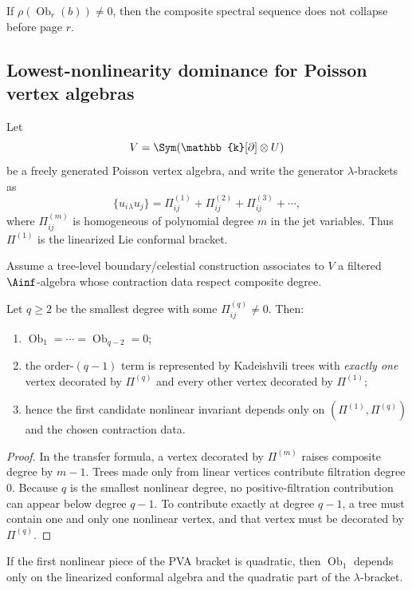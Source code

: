 \begin{corollary}
If $\rho(\operatorname{Ob}_r(b))\neq0$, then the composite spectral sequence does not collapse before page $r$.
\end{corollary}

\subsection{Lowest-nonlinearity dominance for Poisson vertex algebras}

Let
\[
V=\Sym(\mathbb{k}[\partial]\otimes U)
\]
be a freely generated Poisson vertex algebra, and write the generator $\lambda$-brackets as
\[
\{u_i{}_\lambda u_j\}
=
\Pi^{(1)}_{ij}
+\Pi^{(2)}_{ij}
+\Pi^{(3)}_{ij}
+\cdots,
\]
where $\Pi^{(m)}_{ij}$ is homogeneous of polynomial degree $m$ in the jet variables. Thus $\Pi^{(1)}$ is the linearized Lie conformal bracket.

Assume a tree-level boundary/celestial construction associates to $V$ a filtered $\Ainf$-algebra whose contraction data respect composite degree.

\begin{theorem}
Let $q\ge2$ be the smallest degree with some $\Pi^{(q)}_{ij}\neq0$. Then:
\begin{enumerate}[label=\textup{(\roman*)},leftmargin=2em]
\item $\operatorname{Ob}_1=\cdots=\operatorname{Ob}_{q-2}=0$;
\item the order-$(q-1)$ term is represented by Kadeishvili trees with \emph{exactly one} vertex decorated by $\Pi^{(q)}$ and every other vertex decorated by $\Pi^{(1)}$;
\item hence the first candidate nonlinear invariant depends only on $(\Pi^{(1)},\Pi^{(q)})$ and the chosen contraction data.
\end{enumerate}
\end{theorem}

\begin{proof}
In the transfer formula, a vertex decorated by $\Pi^{(m)}$ raises composite degree by $m-1$. Trees made only from linear vertices contribute filtration degree $0$. Because $q$ is the smallest nonlinear degree, no positive-filtration contribution can appear below degree $q-1$. To contribute exactly at degree $q-1$, a tree must contain one and only one nonlinear vertex, and that vertex must be decorated by $\Pi^{(q)}$.
\end{proof}

\begin{corollary}
If the first nonlinear piece of the PVA bracket is quadratic, then $\operatorname{Ob}_1$ depends only on the linearized conformal algebra and the quadratic part of the $\lambda$-bracket.
\end{corollary}

